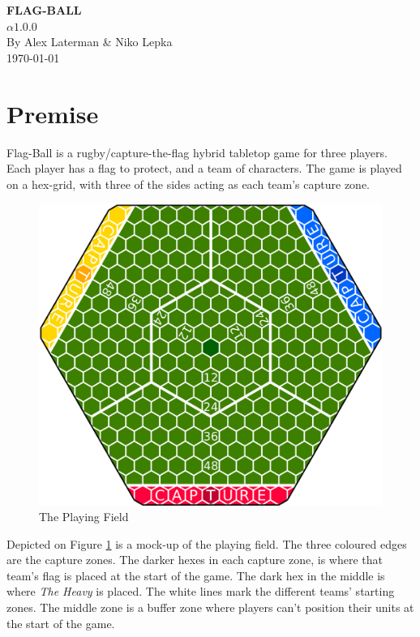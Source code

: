 \documentclass[a4paper]{book}
\begin{document}
\begin{titlepage}
\begin{center}
    \huge{\textbf{FLAG-BALL}}\\
    \LARGE{
        $\alpha1.0.0$\\
        By Alex Laterman \& Niko Lepka
    }\\
    \Large{\today}
\end{center}
\end{titlepage}
\thispagestyle{empty} %
\frontmatter %

\section*{Premise}
Flag-Ball is a rugby/capture-the-flag hybrid tabletop game for three players.
Each player has a flag to protect, and a team of characters.
The game is played on a hex-grid, with three of the sides acting as each team's capture zone.
\begin{figure}
    \centering
    \includegraphics[width=\textwidth]{graphics/board-2}
    \caption{The Playing Field}
    \label{fig:court}
\end{figure}
Depicted on Figure \ref{fig:court} is a mock-up of the playing field.
The three coloured edges are the capture zones.
The darker hexes in each capture zone, is where that team's flag is placed at the start of the game.
The dark hex in the middle is where \textit{The Heavy} is placed.
The white lines mark the different teams' starting zones.
The middle zone is a buffer zone where players can’t position their units at the start of the game.
\end{document}
